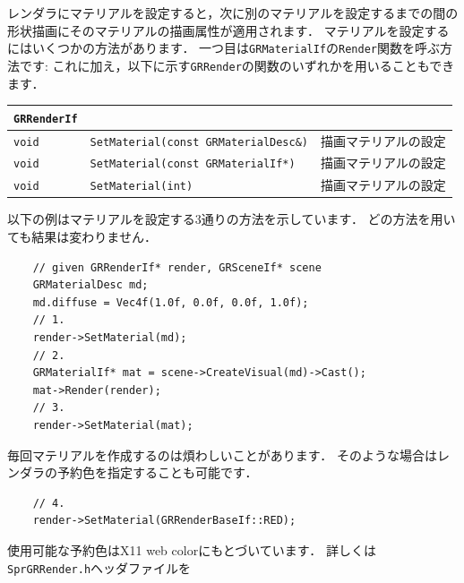 \KLUDGE レンダラにマテリアルを設定すると，次に別のマテリアルを設定するまでの間の
\KLUDGE 形状描画にそのマテリアルの描画属性が適用されます．
\KLUDGE マテリアルを設定するにはいくつかの方法があります．
\KLUDGE 一つ目は\texttt{GRMaterialIf}の\texttt{Render}関数を呼ぶ方法です:
\KLUDGE これに加え，以下に示す\texttt{GRRender}の関数のいずれかを用いることもできます．
\begin{center}
\begin{tabular}{p{.1\hsize}p{.5\hsize}p{.3\hsize}}
\texttt{GRRenderIf}																\\ \midrule
\texttt{void} & \texttt{SetMaterial(const GRMaterialDesc\&)}		& 描画マテリアルの設定	\\
\texttt{void} & \texttt{SetMaterial(const GRMaterialIf*)}			& 描画マテリアルの設定	\\
\texttt{void} & \texttt{SetMaterial(int)}							& 描画マテリアルの設定	\\
\end{tabular}
\end{center}
\KLUDGE 以下の例はマテリアルを設定する3通りの方法を示しています．
\KLUDGE どの方法を用いても結果は変わりません．
\begin{verbatim}
    // given GRRenderIf* render, GRSceneIf* scene
    GRMaterialDesc md;
    md.diffuse = Vec4f(1.0f, 0.0f, 0.0f, 1.0f);
    // 1.
    render->SetMaterial(md);
    // 2.
    GRMaterialIf* mat = scene->CreateVisual(md)->Cast();
    mat->Render(render);
    // 3.
    render->SetMaterial(mat);
\end{verbatim}
\KLUDGE 毎回マテリアルを作成するのは煩わしいことがあります．
\KLUDGE そのような場合はレンダラの予約色を指定することも可能です．
\begin{verbatim}
    // 4.
    render->SetMaterial(GRRenderBaseIf::RED);
\end{verbatim}
\KLUDGE 使用可能な予約色はX11 web colorにもとづいています．
\KLUDGE 詳しくは\texttt{SprGRRender.h}ヘッダファイルを

